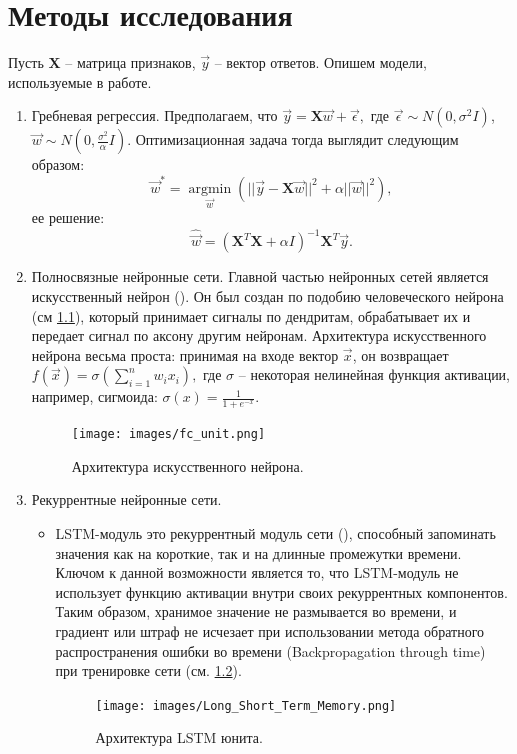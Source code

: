 \documentclass[pdftex,ptm,12pt,a4paper]{report}
\theoremstyle{definition}
\begin{document}
\chapter{Методы исследования}
Пусть $\mathbf{X}$ -- матрица признаков, $\vec{y}$ -- вектор ответов. 
Опишем модели, используемые в работе.
\begin{enumerate}
\item Гребневая регрессия. Предполагаем, что $\vec{y} = \mathbf{X}\vec{w} + \vec{\epsilon},$ где $\vec{\epsilon} \sim N(0, \sigma^2I)$,\\ $\vec{w} \sim N(0,\frac{\sigma^2}{\alpha}I)$. Оптимизационная задача тогда выглядит следующим образом:
\[
\vec{w}^{*} = \underset{\vec{w}}{\operatorname{argmin}}(||\vec{y} - \mathbf{X}
\vec{w}||^{2} + \alpha ||\vec{w}||^2),
\]
ее решение:
\[
\hat{\vec{w}} = (\mathbf{X}^{T}\mathbf{X} + \alpha I)^{-1}\mathbf{X}^{T}\vec{y}.
\]

\item Полносвязные нейронные сети.
Главной частью нейронных сетей является искусственный нейрон (\cite{rosenblatt1958perceptron}). Он был создан по подобию человеческого нейрона (см \ref{fc_unit}), который принимает сигналы по дендритам, обрабатывает их и передает сигнал по аксону другим нейронам. Архитектура искусственного нейрона весьма проста: принимая на входе вектор $\vec{x}$, он возвращает $f(\vec{x}) = \sigma(\sum_{i=1}^n w_i x_i),$ где $\sigma$ -- некоторая нелинейная функция активации, например, сигмоида: $\sigma(x) = \frac{1}{1 + e^{-x}}.$

\begin{figure}[h]
\texttt{[image: images/fc\_unit.png]}
\centering
\caption{Архитектура искусственного нейрона.}
\label{fc_unit}
\end{figure}

\item Рекуррентные нейронные сети.
\begin{itemize}
\item LSTM-модуль это рекуррентный модуль сети (\cite{graves2005framewise}), способный запоминать значения как на короткие, так и на длинные промежутки времени. Ключом к данной возможности является то, что LSTM-модуль не использует функцию активации внутри своих рекуррентных компонентов. Таким образом, хранимое значение не размывается во времени, и градиент или штраф не исчезает при использовании метода обратного распространения ошибки во времени (Backpropagation through time) при тренировке сети (см. \ref{lstm_unit}).

\begin{figure}[h]
\texttt{[image: images/Long\_Short\_Term\_Memory.png]}
\centering
\caption{Архитектура LSTM юнита.}
\label{lstm_unit}
\end{figure}


\end{itemize}
\end{enumerate}
\end{document}
